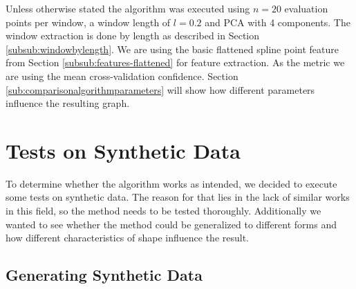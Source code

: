 \documentclass[pdftex,12pt,a4paper]{report}
\begin{document}
Unless otherwise stated the algorithm was executed using $n=20$ evaluation points per window, a window length of $l=0.2$ and PCA with 4 components. The window extraction is done by length as described in Section \ref{subsub:windowbylength}. We are using the basic flattened spline point feature from Section \ref{subsub:features-flattened} for feature extraction. As the metric we are using the mean cross-validation confidence. Section \ref{sub:comparisonalgorithmparameters} will show how different parameters influence the resulting graph.

\section{Tests on Synthetic Data}

To determine whether the algorithm works as intended, we decided to execute some tests on synthetic data. The reason for that lies in the lack of similar works in this field, so the method needs to be tested thoroughly. Additionally we wanted to see whether the method could be generalized to different forms and how different characteristics of shape influence the result. 

\subsection{Generating Synthetic Data}
\label{sub:generating-synthetic-data}
\end{document}
